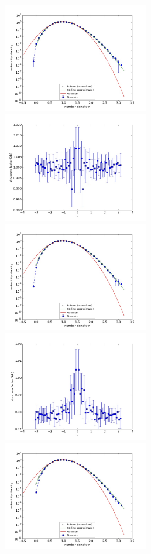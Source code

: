 \documentclass{article}
\begin{document}
\begin{figure}
\begin{center}
\end{center}
\includegraphics[width=0.5\linewidth,height=1.9in]{fig1/appendix_dt0.01_react_hist_avg1.jpg}
\includegraphics[width=0.5\linewidth,height=1.9in]{fig1/appendix_dt0.01_react_Sk_avg1.jpg}
\includegraphics[width=0.5\linewidth,height=1.9in]{fig1/appendix_dt0.01_react_hist_avg2.jpg}
\includegraphics[width=0.5\linewidth,height=1.9in]{fig1/appendix_dt0.01_react_Sk_avg2.jpg}
\includegraphics[width=0.5\linewidth,height=1.9in]{fig1/appendix_dt0.01_react_hist_avg3.jpg}

\end{figure}
\end{document}
